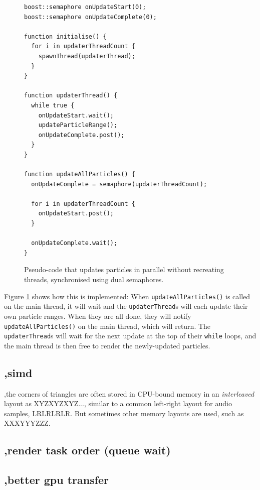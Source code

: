 \documentclass[11pt, a4paper, twocolumn]{article}
\begin{document}
\begin{figure}[h]
\begin{verbatim}
boost::semaphore onUpdateStart(0);
boost::semaphore onUpdateComplete(0);

function initialise() {
  for i in updaterThreadCount {
    spawnThread(updaterThread);
  }
}

function updaterThread() {
  while true {
    onUpdateStart.wait();
    updateParticleRange();
    onUpdateComplete.post();
  }
}

function updateAllParticles() {
  onUpdateComplete = semaphore(updaterThreadCount);
  
  for i in updaterThreadCount {
    onUpdateStart.post();
  }
  
  onUpdateComplete.wait();
}
\end{verbatim}
\caption{Pseudo-code that updates particles in parallel without recreating threads, synchronised using dual semaphores.}
\label{fig:semaphore_pseudo}
\end{figure}

Figure \ref{fig:semaphore_pseudo} shows how this is implemented: When \verb|updateAllParticles()| is called on the main thread, it will wait and the \verb|updaterThread|s will each update their own particle ranges. When they are all done, they will notify \verb|updateAllParticles()| on the main thread, which will return. The \verb|updaterThread|s will wait for the next update at the top of their \verb|while| loops, and the main thread is then free to render the newly-updated particles.

\subsection{,simd} \label{sec:simd}

,the corners of triangles are often stored in CPU-bound memory in an \emph{interleaved} layout as XYZXYZXYZ..., similar to a common left-right layout for audio samples, LRLRLRLR. But sometimes other memory layouts are used, such as XXXYYYZZZ.

\subsection{,render task order (queue wait)}

\subsection{,better gpu transfer}
\end{document}
